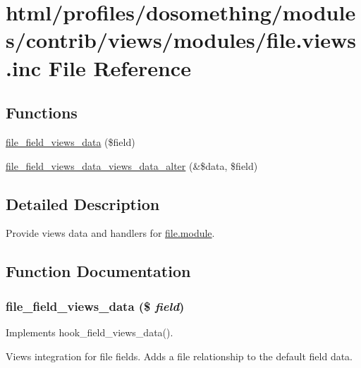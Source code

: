 \hypertarget{file_8views_8inc}{
\section{html/profiles/dosomething/modules/contrib/views/modules/file.views.inc File Reference}
\label{file_8views_8inc}
}
\subsection*{Functions}
\begin{DoxyCompactItemize}
\item 
\hyperlink{file_8views_8inc_a86c31b4946a93801820aa2584fba800f}{file\_\-field\_\-views\_\-data} (\$field)
\item 
\hyperlink{file_8views_8inc_a79ca6a104321acf7e32c0f6d6950f70e}{file\_\-field\_\-views\_\-data\_\-views\_\-data\_\-alter} (\&\$data, \$field)
\end{DoxyCompactItemize}


\subsection{Detailed Description}
Provide views data and handlers for \hyperlink{file_8module}{file.module}. 

\subsection{Function Documentation}
\hypertarget{file_8views_8inc_a86c31b4946a93801820aa2584fba800f}{
\subsubsection[{file\_\-field\_\-views\_\-data}]{\setlength{\rightskip}{0pt plus 5cm}file\_\-field\_\-views\_\-data (\$ {\em field})}}
\label{file_8views_8inc_a86c31b4946a93801820aa2584fba800f}
Implements hook\_\-field\_\-views\_\-data().

Views integration for file fields. Adds a file relationship to the default field data.

